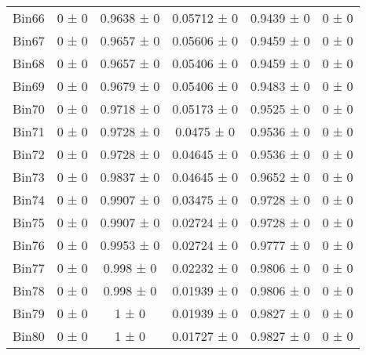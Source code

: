 \begin{tabular}{@{\extracolsep{4pt}}lccccc@{}}
     Bin66 & 0 ± 0 & 0.9638 ± 0 & 0.05712 ± 0 & 0.9439 ± 0 & 0 ± 0 \\ 
     Bin67 & 0 ± 0 & 0.9657 ± 0 & 0.05606 ± 0 & 0.9459 ± 0 & 0 ± 0 \\ 
     Bin68 & 0 ± 0 & 0.9657 ± 0 & 0.05406 ± 0 & 0.9459 ± 0 & 0 ± 0 \\ 
     Bin69 & 0 ± 0 & 0.9679 ± 0 & 0.05406 ± 0 & 0.9483 ± 0 & 0 ± 0 \\ 
     Bin70 & 0 ± 0 & 0.9718 ± 0 & 0.05173 ± 0 & 0.9525 ± 0 & 0 ± 0 \\ 
     Bin71 & 0 ± 0 & 0.9728 ± 0 & 0.0475 ± 0 & 0.9536 ± 0 & 0 ± 0 \\ 
     Bin72 & 0 ± 0 & 0.9728 ± 0 & 0.04645 ± 0 & 0.9536 ± 0 & 0 ± 0 \\ 
     Bin73 & 0 ± 0 & 0.9837 ± 0 & 0.04645 ± 0 & 0.9652 ± 0 & 0 ± 0 \\ 
     Bin74 & 0 ± 0 & 0.9907 ± 0 & 0.03475 ± 0 & 0.9728 ± 0 & 0 ± 0 \\ 
     Bin75 & 0 ± 0 & 0.9907 ± 0 & 0.02724 ± 0 & 0.9728 ± 0 & 0 ± 0 \\ 
     Bin76 & 0 ± 0 & 0.9953 ± 0 & 0.02724 ± 0 & 0.9777 ± 0 & 0 ± 0 \\ 
     Bin77 & 0 ± 0 & 0.998 ± 0 & 0.02232 ± 0 & 0.9806 ± 0 & 0 ± 0 \\ 
     Bin78 & 0 ± 0 & 0.998 ± 0 & 0.01939 ± 0 & 0.9806 ± 0 & 0 ± 0 \\ 
     Bin79 & 0 ± 0 & 1 ± 0 & 0.01939 ± 0 & 0.9827 ± 0 & 0 ± 0 \\ 
     Bin80 & 0 ± 0 & 1 ± 0 & 0.01727 ± 0 & 0.9827 ± 0 & 0 ± 0 \\ 
\hline\hline
  \end{tabular}
